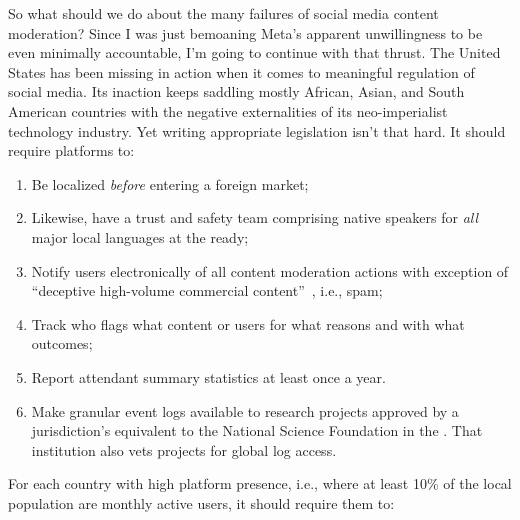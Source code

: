 So what should we do about the many failures of social media content moderation?
Since I was just bemoaning Meta's apparent unwillingness to be even minimally
accountable, I'm going to continue with that thrust. The United States has been
missing in action when it comes to meaningful regulation of social media. Its
inaction keeps saddling mostly African, Asian, and South American countries with
the negative externalities of its neo-imperialist technology industry. Yet
writing appropriate legislation isn't that hard. It should require platforms to:
\begin{enumerate}
    \item Be localized \emph{before} entering a foreign market;
        \label{itm:law:localized}
    \item Likewise, have a trust and safety team comprising native speakers for
        \emph{all} major local languages at the ready; \label{itm:law:team}
    \item Notify users electronically of all content moderation actions with
        exception of ``deceptive high-volume commercial
        content''~\cite{EuropeanParliamentAndCouncil2022}, i.e., spam;
    \item Track who flags what content or users for what reasons and with what
        outcomes;
    \item Report attendant summary statistics at least once a year.
    \item Make granular event logs available to research projects approved by a
        jurisdiction's equivalent to the National Science Foundation in the \US.
        That institution also vets projects for global log access.
        \label{itm:law:research}
\end{enumerate}
For each country with high platform presence, i.e., where at least 10\% of the
local population are monthly active users, it should require them to:
